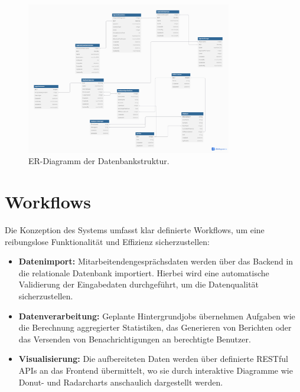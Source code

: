 \begin{figure}[h!]
    \centering
    \includegraphics[width=0.8\textwidth]{images/er_modell_design.png}
    \caption{ER-Diagramm der Datenbankstruktur.}
    \label{fig:db_er_model}
\end{figure}

\section{Workflows}
Die Konzeption des Systems umfasst klar definierte Workflows, um eine reibungslose Funktionalität und Effizienz sicherzustellen:
\begin{itemize}
    \item \textbf{Datenimport:} Mitarbeitendengesprächsdaten werden über das Backend in die relationale Datenbank importiert. Hierbei wird eine automatische Validierung der Eingabedaten durchgeführt, um die Datenqualität sicherzustellen.
    \item \textbf{Datenverarbeitung:} Geplante Hintergrundjobs übernehmen Aufgaben wie die Berechnung aggregierter Statistiken, das Generieren von Berichten oder das Versenden von Benachrichtigungen an berechtigte Benutzer.
    \item \textbf{Visualisierung:} Die aufbereiteten Daten werden über definierte RESTful APIs an das Frontend übermittelt, wo sie durch interaktive Diagramme wie Donut- und Radarcharts anschaulich dargestellt werden.
\end{itemize}

